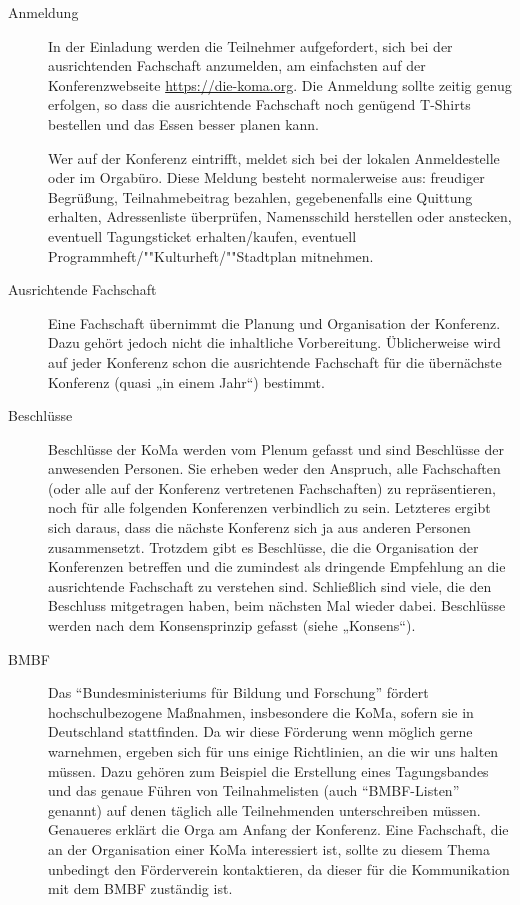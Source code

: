 \begin{description}
\item[Anmeldung]
    In der Einladung werden die Teilnehmer aufgefordert, sich bei der ausrichtenden Fachschaft anzumelden, am einfachsten auf der Konferenzwebseite \url{https://die-koma.org}. Die Anmeldung sollte zeitig genug erfolgen, so dass die ausrichtende Fachschaft noch genügend T-Shirts bestellen und das Essen besser planen kann.

	Wer auf der Konferenz eintrifft, meldet sich bei der lokalen Anmeldestelle oder im Orgabüro. Diese Meldung besteht normalerweise aus: freudiger Begrüßung, Teilnahmebeitrag bezahlen, gegebenenfalls eine Quittung erhalten, Adressenliste überprüfen, Namensschild herstellen oder anstecken, eventuell Tagungsticket erhalten/kaufen, eventuell Programmheft/""Kulturheft/""Stadtplan mitnehmen.

\item[Ausrichtende Fachschaft]
    Eine Fachschaft übernimmt die Planung und Organisation der Konferenz. Dazu gehört jedoch nicht die inhaltliche Vorbereitung. Üblicherweise wird auf jeder Konferenz schon die ausrichtende Fachschaft für die übernächste Konferenz (quasi „in einem Jahr“) bestimmt.

\item[Beschlüsse]
    Beschlüsse der KoMa werden vom Plenum gefasst und sind Beschlüsse der anwesenden Personen. Sie erheben weder den Anspruch, alle Fachschaften (oder alle auf der Konferenz vertretenen Fachschaften) zu 	repräsentieren, noch für alle folgenden Konferenzen verbindlich zu sein. Letzteres ergibt sich daraus, dass die nächste Konferenz sich ja aus anderen Personen zusammensetzt. Trotzdem gibt es Beschlüsse, die die Organisation der Konferenzen betreffen und die zumindest als dringende Empfehlung an die ausrichtende Fachschaft zu verstehen sind. Schließlich sind viele, die den Beschluss mitgetragen haben, beim nächsten Mal wieder dabei. Beschlüsse werden nach dem Konsensprinzip gefasst (siehe „Konsens“).

\item[BMBF]
    Das \enquote{Bundesministeriums für Bildung und Forschung} fördert hochschulbezogene Maßnahmen, insbesondere die KoMa, sofern sie in Deutschland stattfinden. Da wir diese Förderung wenn möglich gerne warnehmen, ergeben sich für uns einige Richtlinien, an die wir uns halten müssen. Dazu gehören zum Beispiel die Erstellung eines Tagungsbandes und das genaue Führen von Teilnahmelisten (auch \enquote{BMBF-Listen} genannt) auf denen täglich alle Teilnehmenden unterschreiben müssen. Genaueres erklärt die Orga am Anfang der Konferenz. Eine Fachschaft, die an der Organisation einer KoMa interessiert ist, sollte zu diesem Thema unbedingt den Förderverein kontaktieren, da dieser für die Kommunikation mit dem BMBF zuständig ist.


\end{description}
